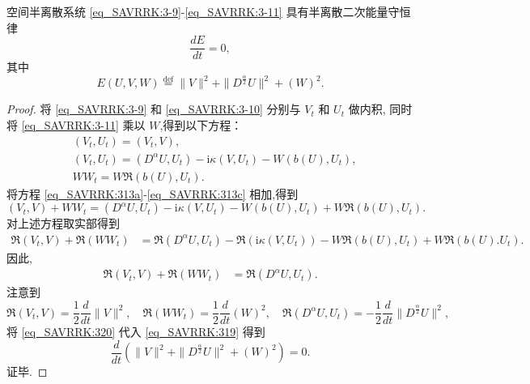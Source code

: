 \begin{theorem}	\label{thm3}
空间半离散系统 \eqref{eq_SAVRRK:3-9}-\eqref{eq_SAVRRK:3-11} 具有半离散二次能量守恒律
\begin{equation}
\frac{dE}{dt}=0, \label{eq_SAVRRK:313a}
\end{equation}
其中
\begin{equation}
E(U,V,W)\overset{\text{def}}{=}\|V\|^2 + \|D^\frac{\alpha}{2} U\|^2+\left(W\right)^2.\label{eq_SAVRRK:313}
\end{equation}
\end{theorem}

\begin{proof}
	将 \eqref{eq_SAVRRK:3-9} 和 \eqref{eq_SAVRRK:3-10} 分别与 $V_t$ 和 $U_t$ 做内积, 
	同时将 \eqref{eq_SAVRRK:3-11} 乘以 $W$,得到以下方程：
\begin{align}
&\left(V_t, U_t\right)=\left(V_t, V\right), \label{eq_SAVRRK:313a}\\
&\left(V_t, U_t\right)=\left(D^{\alpha} U, U_t\right)-\mathrm{i} \kappa\left(V, U_t\right)-W\left(b(U), U_t\right), \label{eq_SAVRRK:313b}\\
&W W_t=W\Re\left(b(U), U_t\right).\label{eq_SAVRRK:313c}
\end{align}
将方程 \eqref{eq_SAVRRK:313a}-\eqref{eq_SAVRRK:313c} 相加,得到
\begin{equation}
\left(V_t, V\right) + W W_t= \left(D^{\alpha} U, U_t\right)-\mathrm{i} \kappa\left(V, U_t\right)-W\left(b(U), U_t\right) + W\Re\left(b(U), U_t\right).
\end{equation}
对上述方程取实部得到
\begin{align}
\Re\left(V_t, V\right) + \Re\left(W W_t\right)&= \Re\left(D^{\alpha} U, U_t\right)-\Re\left(\mathrm{i} \kappa\left(V, U_t\right)\right)-W\Re\left(b(U), U_t\right) + W\Re\left(b(U). U_t\right).
\end{align}
因此,
\begin{align}
\Re\left(V_t, V\right) + \Re\left(W W_t\right)&= \Re\left(D^{\alpha} U, U_t\right).\label{eq_SAVRRK:319}
\end{align}
注意到
\begin{equation}
\Re\left(V_t, V\right) = \frac{1}{2}\frac{d }{d t}\|V\|^2, \quad \Re\left(W W_t\right) = \frac{1}{2}\frac{d }{d t}\left(W\right)^2,\quad \Re\left(D^{\alpha} U, U_t\right)=-\frac{1}{2}\frac{d }{d t}\|D^\frac{\alpha}{2}U\|^2,\label{eq_SAVRRK:320}
\end{equation}
将 \eqref{eq_SAVRRK:320} 代入 \eqref{eq_SAVRRK:319} 得到
\begin{equation}
\frac{d }{d t}\left(\|V\|^2+\|D^\frac{\alpha}{2}U\|^2+\left(W\right)^2\right)=0.
\end{equation}
证毕.
\end{proof}

